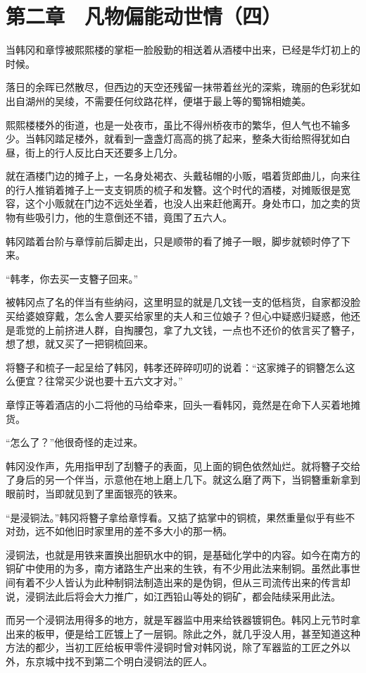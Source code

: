 \section{第二章　凡物偏能动世情（四）}

当韩冈和章惇被熙熙楼的掌柜一脸殷勤的相送着从酒楼中出来，已经是华灯初上的时候。

落日的余晖已然散尽，但西边的天空还残留一抹带着丝光的深紫，瑰丽的色彩犹如出自湖州的吴绫，不需要任何纹路花样，便堪于最上等的蜀锦相媲美。

熙熙楼楼外的街道，也是一处夜市，虽比不得州桥夜市的繁华，但人气也不输多少。当韩冈踏足楼外，就看到一盏盏灯高高的挑了起来，整条大街给照得犹如白昼，街上的行人反比白天还要多上几分。

就在酒楼门边的摊子上，一名身处褐衣、头戴毡帽的小贩，唱着货郎曲儿，向来往的行人推销着摊子上一支支铜质的梳子和发簪。这个时代的酒楼，对摊贩很是宽容，这个小贩就在门边不远处坐着，也没人出来赶他离开。身处市口，加之卖的货物有些吸引力，他的生意倒还不错，竟围了五六人。

韩冈踏着台阶与章惇前后脚走出，只是顺带的看了摊子一眼，脚步就顿时停了下来。

“韩孝，你去买一支簪子回来。”

被韩冈点了名的伴当有些纳闷，这里明显的就是几文钱一支的低档货，自家都没脸买给婆娘穿戴，怎么舍人要买给家里的夫人和三位娘子？但心中疑惑归疑惑，他还是乖觉的上前挤进人群，自掏腰包，拿了九文钱，一点也不还价的依言买了簪子，想了想，就又买了一把铜梳回来。

将簪子和梳子一起呈给了韩冈，韩孝还碎碎叨叨的说着：“这家摊子的铜簪怎么这么便宜？往常买少说也要十五六文才对。”

章惇正等着酒店的小二将他的马给牵来，回头一看韩冈，竟然是在命下人买着地摊货。

“怎么了？”他很奇怪的走过来。

韩冈没作声，先用指甲刮了刮簪子的表面，见上面的铜色依然灿烂。就将簪子交给了身后的另一个伴当，示意他在地上磨上几下。就这么磨了两下，当铜簪重新拿到眼前时，当即就见到了里面银亮的铁来。

“是浸铜法。”韩冈将簪子拿给章惇看。又掂了掂掌中的铜梳，果然重量似乎有些不对劲，远不如他旧时家里用的差不多大小的那一柄。

浸铜法，也就是用铁来置换出胆矾水中的铜，是基础化学中的内容。如今在南方的铜矿中使用的为多，南方诸路生产出来的生铁，有不少用此法来制铜。虽然此事世间有着不少人皆认为此种制铜法制造出来的是伪铜，但从三司流传出来的传言却说，浸铜法此后将会大力推广，如江西铅山等处的铜矿，都会陆续采用此法。

而另一个浸铜法用得多的地方，就是军器监中用来给铁器镀铜色。韩冈上元节时拿出来的板甲，便是给工匠镀上了一层铜。除此之外，就几乎没人用，甚至知道这种方法的都少，当初工匠给板甲零件浸铜时曾对韩冈说，除了军器监的工匠之外以外，东京城中找不到第二个明白浸铜法的匠人。

